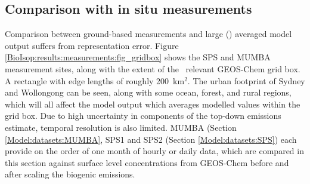       
      
    
%      
%      

  
  \subsection{Comparison with in situ measurements}
    \label{BioIsop:results:measurements}
    
    Comparison between ground-based measurements and large (\lowhr) averaged model output suffers from representation error.
    Figure \ref{BioIsop:results:measurements:fig_gridbox} shows the SPS and MUMBA measurement sites, along with the extent of the \lowhr ~relevant GEOS-Chem grid box.
    A rectangle with edge lengths of roughly 200~km$^{2}$.
    The urban footprint of Sydney and Wollongong can be seen, along with some ocean, forest, and rural regions, which will all affect the model output which averages modelled values within the grid box.
    Due to high uncertainty in components of the top-down emissions estimate, temporal resolution is also limited.
    MUMBA (Section \ref{Model:datasets:MUMBA}, SPS1 and SPS2 (Section \ref{Model:datasets:SPS}) each provide on the order of one month of hourly or daily data, which are compared in this section against surface level concentrations from GEOS-Chem before and after scaling the biogenic emissions.
    

